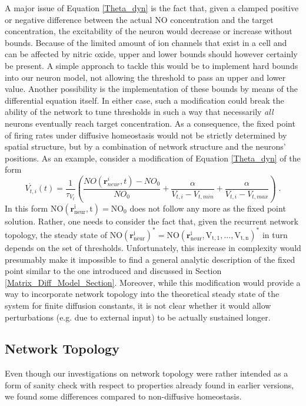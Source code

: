 \documentclass[10pt,a4paper]{article}
\begin{document}
A major issue of Equation \eqref{Theta_dyn} is the fact that, given a clamped positive or negative difference between the actual NO concentration and the target concentration, the excitability of the neuron would decrease or increase without bounds. Because of the limited amount of ion channels that exist in a cell and can be affected by nitric oxide, upper and lower bounds should however certainly be present. A simple approach to tackle this would be to implement hard bounds into our neuron model, not allowing the threshold to pass an upper and lower value. Another possibility is the implementation of these bounds by means of the differential equation itself. In either case, such a modification could break the ability of the network to tune thresholds in such a way that necessarily \emph{all} neurons eventually reach target concentration. As a consequence, the fixed point of firing rates under diffusive homeostasis would not be strictly determined by spatial structure, but by a combination of network structure and the neurons' positions. As an example, consider a modification of Equation \eqref{Theta_dyn} of the form
\begin{equation}
\dot{V_{t,i}}(t) = \frac{1}{\tau_{V_t}}\left(\frac{NO(\mathbf{r}_{neur}^i,t)-NO_0}{NO_0} + \frac{\alpha}{V_{t,i} - V_{t,min}} + \frac{\alpha}{V_{t,i} - V_{t,max}}\right) \; .
\label{Theta_dyn_with_Bounds}
\end{equation}
In this form $\mathrm{NO(\mathbf{r}_{neur}^i,t) = NO_0}$ does not follow any more as the fixed point solution. Rather, one needs to consider the fact that, given the recurrent network topology, the steady state of $\mathrm{NO(\mathbf{r}_{neur}^i)^* = NO(\mathbf{r}_{neur}^i,V_{t,1},...,V_{t,n})^*}$ in turn depends on the set of thresholds. Unfortunately, this increase in complexity would presumably make it impossible to find a general analytic description of the fixed point similar to the one introduced and discussed in Section \ref{Matrix_Diff_Model_Section}. Moreover, while this modification would provide a way to incorporate network topology into the theoretical steady state of the system for finite diffusion constants, it is not clear whether it would allow perturbations (e.g. due to external input) to be actually sustained longer.

\subsection{Network Topology} 
Even though our investigations on network topology were rather intended as a form of sanity check with respect to properties already found in earlier versions, we found some differences compared to non-diffusive homeostasis.
\end{document}
